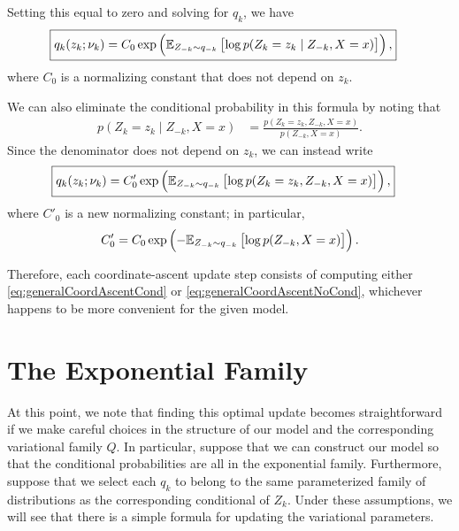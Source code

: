 \documentclass[11pt]{article}
\begin{document}
Setting this equal to zero and solving for $q_k$, we have
\begin{align}
\label{eq:generalCoordAscentCond}
\Aboxed{
q_k(z_k; \nu_k)
&= C_0 \exp \left( \expectOver{Z_{-k} \sim q_{-k}}{ \log p(Z_k = z_k \mid Z_{-k}, X = x) } \right),
}
\end{align}
where $C_0$ is a normalizing constant that does not depend on $z_k$.

We can also eliminate the conditional probability in this formula by noting that
\begin{align}
p(Z_k = z_k \mid Z_{-k}, X = x)
&= \frac{p(Z_k = z_k, Z_{-k}, X = x)}{p(Z_{-k}, X = x)}.
\end{align}
Since the denominator does not depend on $z_k$, we can instead write
\begin{align}
\label{eq:generalCoordAscentNoCond}
\Aboxed{
q_k(z_k; \nu_k)
&= C'_0 \exp \left( \expectOver{Z_{-k} \sim q_{-k}}{ \log p(Z_k = z_k, Z_{-k}, X = x) } \right),
}
\end{align}
where $C'_0$ is a new normalizing constant; in particular,
\begin{align}
C'_0 = C_0 \exp \left( -\mathbb{E}_{\substack{Z_{-k} \sim q_{-k}}}\left[  \log p(Z_{-k}, X = x)  \right]\right).
\end{align}

Therefore, each coordinate-ascent update step consists of computing either \eqref{eq:generalCoordAscentCond} or \eqref{eq:generalCoordAscentNoCond}, whichever happens to be more convenient for the given model.

\section{The Exponential Family}

At this point, we note that finding this optimal update becomes straightforward if we make careful choices in the structure of our model and the corresponding variational family $Q$.
In particular, suppose that we can construct our model so that the conditional probabilities are all in the exponential family.
Furthermore, suppose that we select each $q_k$ to belong to the same parameterized family of distributions as the corresponding conditional of $Z_k$.
Under these assumptions, we will see that there is a simple formula for updating the variational parameters.
\end{document}
